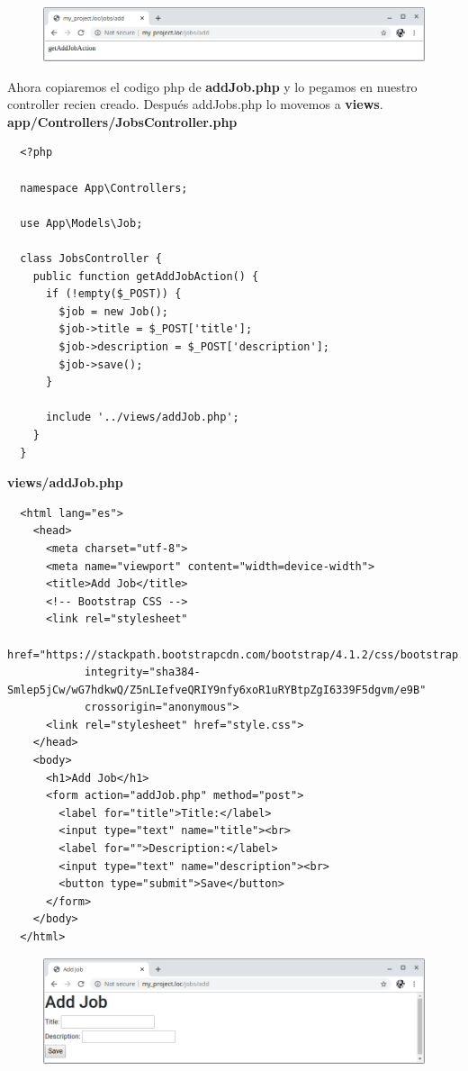 \documentclass{article}
\begin{document}
\begin{figure}[h!]
  \centering
  \includegraphics[scale=0.5]{./Pictures/131_getAddJob_ok.png}
\end{figure}

Ahora copiaremos el codigo php de \textbf{addJob.php} y lo pegamos en nuestro
controller recien creado. Después addJobs.php lo movemos a \textbf{views}.\\

\textbf{app/Controllers/JobsController.php}
\begin{verbatim}
  <?php

  namespace App\Controllers;

  use App\Models\Job;

  class JobsController {
    public function getAddJobAction() {
      if (!empty($_POST)) {
        $job = new Job();
        $job->title = $_POST['title'];
        $job->description = $_POST['description'];
        $job->save();
      }

      include '../views/addJob.php';
    }
  }
\end{verbatim}

\textbf{views/addJob.php}
\begin{verbatim}
  <html lang="es">
    <head>
      <meta charset="utf-8">
      <meta name="viewport" content="width=device-width">
      <title>Add Job</title>
      <!-- Bootstrap CSS -->
      <link rel="stylesheet"
            href="https://stackpath.bootstrapcdn.com/bootstrap/4.1.2/css/bootstrap.min.css"
            integrity="sha384-Smlep5jCw/wG7hdkwQ/Z5nLIefveQRIY9nfy6xoR1uRYBtpZgI6339F5dgvm/e9B"
            crossorigin="anonymous">
      <link rel="stylesheet" href="style.css">
    </head>
    <body>
      <h1>Add Job</h1>
      <form action="addJob.php" method="post">
        <label for="title">Title:</label>
        <input type="text" name="title"><br>
        <label for="">Description:</label>
        <input type="text" name="description"><br>
        <button type="submit">Save</button>
      </form>
    </body>
  </html>
\end{verbatim}

\begin{figure}[h!]
  \centering
  \includegraphics[scale=0.5]{./Pictures/132_JobsControllerOK.png}
\end{figure}
\end{document}
